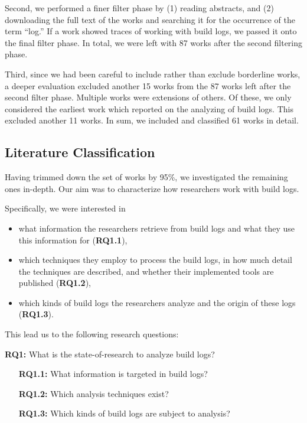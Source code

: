 Second, we performed a finer filter phase by (1) reading abstracts,
and (2) downloading the
full text of the works and searching it
for the occurrence of the term ``log.''
If a work showed traces of
working with build logs, we passed it onto the final filter phase.
In total, we
were left with 87 works after the second filtering phase.

Third, since we had been careful to include rather than exclude borderline
works, a deeper evaluation excluded another 15 works from the 87
works left after the second filter phase.
Multiple works were extensions of others.
Of these, we only considered the earliest work which reported on
the analyzing of build logs.
This excluded another 11 works.
In sum, we included and classified 61 works in detail.

\subsection{Literature Classification}
Having trimmed down the set of works by 95\%, we investigated the
remaining ones in-depth.
Our aim was to characterize how researchers work with build logs.

Specifically, we were interested in
\begin{itemize}
  \item what information the researchers retrieve from build logs and
  what they use this information for (\textbf{RQ1.1}),
  \item which techniques they employ to process the build logs,
  in how much detail the techniques are described,
	and whether their implemented tools are published
  (\textbf{RQ1.2}),
  \item which kinds of build logs the researchers analyze
	and the origin of these logs (\textbf{RQ1.3}).
\end{itemize}

This lead us to the following research questions:
\begin{simplebox}[attach boxed title to top center={yshift=-6mm}]
{\textbf{RQ1:} What is the state-of-research to analyze build logs?}
\begin{itemize}[leftmargin=1cm]
  \item[\textbf{RQ1.1:}] What information is targeted in build logs?
  \item[\textbf{RQ1.2:}] Which analysis techniques exist?
  \item[\textbf{RQ1.3:}] Which kinds of build logs are subject to
  analysis?
\end{itemize}
\end{simplebox}

